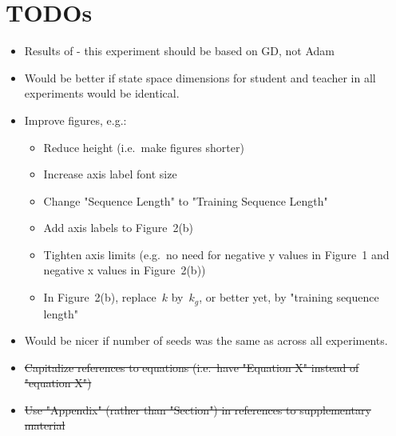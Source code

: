 \section{TODOs}
\begin{itemize}
    \item Results of  -  this experiment should be
    based on GD, not Adam
    \item Would be better if state space dimensions for student and teacher in all experiments would be identical.
    \item Improve figures, e.g.:
    \begin{itemize}
    \item Reduce height (i.e.~make figures shorter)
    \item Increase axis label font size
    \item Change "Sequence Length" to "Training Sequence Length"
    \item Add axis labels to Figure~2(b)
    \item Tighten axis limits (e.g.~no need for negative y values in Figure~1 and negative x values in Figure~2(b))
    \item In Figure~2(b), replace~$k$ by~$k_g$, or better yet, by "training sequence length"
    \end{itemize}
    \item Would be nicer if number of seeds was the same as across all experiments.
    \item \st{Capitalize references to equations (i.e.~have "Equation X" instead of "equation X")}
    \item \st{Use "Appendix" (rather than "Section") in references to supplementary material}
\end{itemize}


